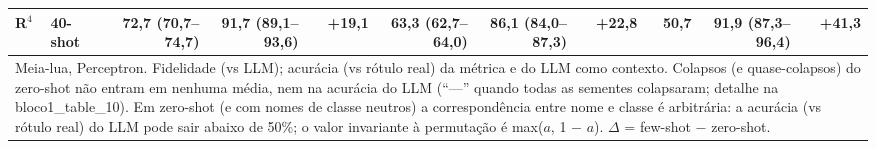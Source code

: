 \begin{table}[htbp]
\begin{tabular}{llrrrrrrrrr}
R$^4$ & 40-shot & 72,7 (70,7–74,7) & 91,7 (89,1–93,6) & +19,1 & 63,3 (62,7–64,0) & 86,1 (84,0–87,3) & +22,8 & 50,7 & 91,9 (87,3–96,4) & +41,3 \\
\bottomrule
\multicolumn{11}{p{0.95\linewidth}}{\footnotesize Meia-lua, Perceptron. Fidelidade (vs LLM); acurácia (vs rótulo real) da métrica e do LLM como contexto. Colapsos (e quase-colapsos) do zero-shot não entram em nenhuma média, nem na acurácia do LLM (``—'' quando todas as sementes colapsaram; detalhe na bloco1\_table\_10). Em zero-shot (e com nomes de classe neutros) a correspondência entre nome e classe é arbitrária: a acurácia (vs rótulo real) do LLM pode sair abaixo de 50\%; o valor invariante à permutação é max($a$, 1 $-$ $a$). $\Delta$ = few-shot $-$ zero-shot.} \\
\end{tabular}
\end{table}
